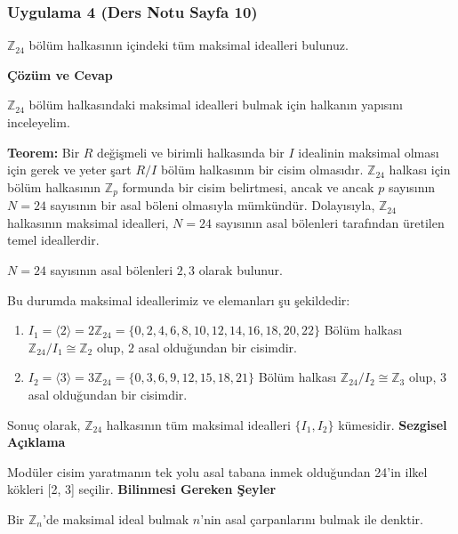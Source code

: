 \documentclass[11pt, a4paper]{article}
\newenvironment{cozum}{
    \vspace{0.5cm}
    \noindent\textcolor{green!60!black}{\faCheckCircle\enspace \textbf{\Large Çözüm ve Cevap}}\par\vspace{0.2cm}
}{}
\newenvironment{sezgisel}{
    \vspace{0.5cm}
    \noindent\textcolor{orange!80!black}{\faLightbulb\enspace \textbf{\Large Sezgisel Açıklama}}\par\vspace{0.2cm}
    \itshape
}{}
\newenvironment{bilgi}{
    \vspace{0.5cm}
    \noindent\textcolor{red!70!black}{\faExclamationTriangle\enspace \textbf{\Large Bilinmesi Gereken Şeyler}}\par\vspace{0.2cm}
}{}
\begin{document}
\subsubsection{Uygulama 4 (Ders Notu Sayfa 10)}
\begin{sorubox}
$\mathbb{Z}_{24}$ bölüm halkasının içindeki tüm maksimal idealleri bulunuz.
\end{sorubox}
\begin{cozum}
$\mathbb{Z}_{24}$ bölüm halkasındaki maksimal idealleri bulmak için halkanın yapısını inceleyelim.

\textbf{Teorem:} Bir $R$ değişmeli ve birimli halkasında bir $I$ idealinin maksimal olması için gerek ve yeter şart $R/I$ bölüm halkasının bir cisim olmasıdır. $\mathbb{Z}_{24}$ halkası için bölüm halkasının $\mathbb{Z}_p$ formunda bir cisim belirtmesi, ancak ve ancak $p$ sayısının $N = 24$ sayısının bir asal böleni olmasıyla mümkündür. Dolayısıyla, $\mathbb{Z}_{24}$ halkasının maksimal idealleri, $N = 24$ sayısının asal bölenleri tarafından üretilen temel ideallerdir.

$N = 24$ sayısının asal bölenleri $2, 3$ olarak bulunur.

Bu durumda maksimal ideallerimiz ve elemanları şu şekildedir:
\begin{enumerate}
    \item $I_{1} = \langle 2 \rangle = 2\mathbb{Z}_{24} = \{0, 2, 4, 6, 8, 10, 12, 14, 16, 18, 20, 22\}$
    Bölüm halkası $\mathbb{Z}_{24} / I_{1} \cong \mathbb{Z}_{2}$ olup, $2$ asal olduğundan bir cisimdir.
    \item $I_{2} = \langle 3 \rangle = 3\mathbb{Z}_{24} = \{0, 3, 6, 9, 12, 15, 18, 21\}$
    Bölüm halkası $\mathbb{Z}_{24} / I_{2} \cong \mathbb{Z}_{3}$ olup, $3$ asal olduğundan bir cisimdir.
\end{enumerate}

Sonuç olarak, $\mathbb{Z}_{24}$ halkasının tüm maksimal idealleri $\{I_1, I_2\}$ kümesidir.
\end{cozum}
\begin{sezgisel}
Modüler cisim yaratmanın tek yolu asal tabana inmek olduğundan 24'in ilkel kökleri [2, 3] seçilir.
\end{sezgisel}
\begin{bilgi}
Bir $\mathbb{Z}_n$'de maksimal ideal bulmak $n$'nin asal çarpanlarını bulmak ile denktir.
\end{bilgi}

\newpage
\end{document}
